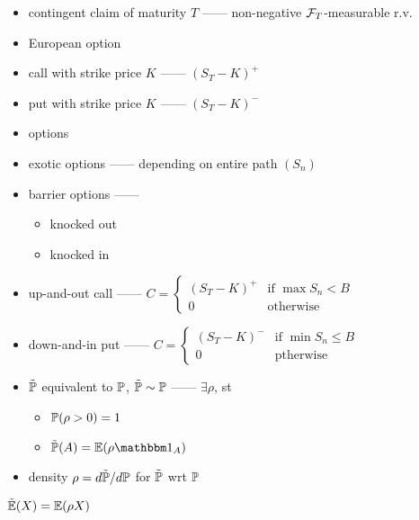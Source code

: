 \begin{itemize}
    \item contingent claim of maturity $T$ ------ non-negative $\mathcal{F}_T$-measurable r.v.
    \item European option
    \item call with strike price $K$ ------ $(S_T - K)^+$
    \item put with strike price $K$ ------ $(S_T - K)^-$
    \item options
    \item exotic options ------ depending on entire path $(S_n)$
    \item barrier options ------
    \begin{itemize}
        \item knocked out
        \item knocked in
    \end{itemize}
    \item up-and-out call ------ $C = \begin{cases}
                                          (S_T - K)^+ & \text{if } \max S_n < B\\
                                          0 & \text{otherwise}
    \end{cases}$
    \item down-and-in put ------ $C = \begin{cases}
                                          (S_T - K)^- & \text{if } \min S_n \leq B\\
                                          0 & \text{ptherwise}
    \end{cases}$
\end{itemize}

\begin{itemize}
    \item $\tilde{\mathbb{P}}$ equivalent to $\mathbb{P}$, $\tilde {\mathbb{P}} \sim \mathbb{P}$ ------ $\exists \rho$, st
    \begin{itemize}
        \item $\mathbb{P}(\rho > 0 ) = 1$
        \item $\tilde\Pb(A) = \Ex(\rho \In_A)$
    \end{itemize}
    \item density $\rho = d\tilde{\mathbb{P}} / d\mathbb{P}$ for $\tilde {\mathbb{P}}$ wrt $\mathbb{P}$
\end{itemize}

\begin{fact}
    $\tilde{\mathbb{E}}(X) = \mathbb{E}(\rho X)$
\end{fact}

